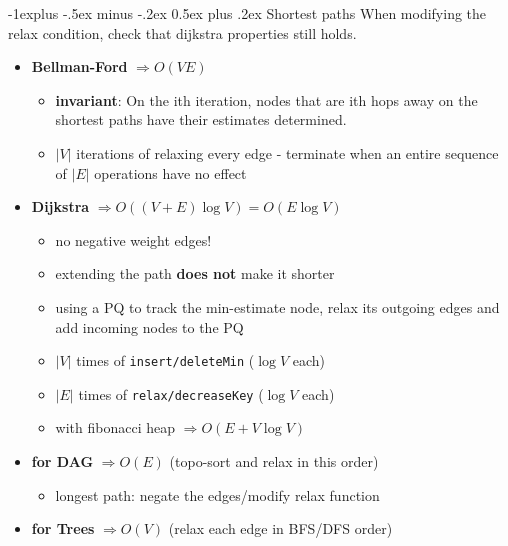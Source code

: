 \documentclass[10pt, landscape]{article}
\makeatletter
\renewcommand{\subsection}{\@startsection{subsection}{2}{0mm}%
                                {-1explus -.5ex minus -.2ex}%
                                {0.5ex plus .2ex}%
                                {\normalfont\normalsize\bfseries}}
\newcommand{\abs}[1]{\vert #1 \vert}
\let\then\Rightarrow
\newcommand{\code}[1]{\textcolor{myblue}{\texttt{#1}}}
\makeatother
\begin{document}
\begin{multicols}{4}
\subsection{Shortest paths}
When modifying the relax condition, check that dijkstra properties still holds.
\begin{itemize}
    \item \textbf{Bellman-Ford} $\then O(VE)$
    \begin{itemize}
        \item \textbf{invariant}: On the ith iteration, nodes that are ith hops away on the shortest paths have their estimates determined.
        \item $\abs{V}$ iterations of relaxing every edge - terminate when an entire sequence of $\abs{E}$ operations have no effect
    \end{itemize}
    \item \textbf{Dijkstra} $\then O((V+E)\log V) = O(E\log V)$
    \begin{itemize}
        \item no negative weight edges!
        \item extending the path \textbf{does not} make it shorter
        \item using a PQ to track the min-estimate node, relax its outgoing edges and add incoming nodes to the PQ
        \item $\abs{V}$ times of \code{insert/deleteMin} ($\log V$ each)
        \item $\abs{E}$ times of \code{relax/decreaseKey} ($\log V$ each)
        \item with fibonacci heap $\then O(E + V \log V)$
    \end{itemize}
    \item \textbf{for DAG} $\then O(E)$ (topo-sort and relax in this order)
    \begin{itemize}
        \item longest path: negate the edges/modify relax function
    \end{itemize}
    \item \textbf{for Trees} $\then O(V)$ (relax each edge in BFS/DFS order)
\end{itemize}


\end{multicols}
\end{document}
